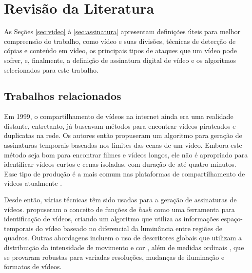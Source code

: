 

\chapter{Revisão da Literatura}
\label{chap:revisao}

As Seções \ref{sec:video} à \ref{sec:assinatura} apresentam definições úteis para melhor compreensão do trabalho, como vídeo e suas divisões, técnicas de detecção de cópias e conteúdo em vídeo, os principais tipos de ataques que um vídeo pode sofrer, e, finalmente, a definição de assinatura digital de vídeo e os algoritmos selecionados para este trabalho.

\section{Trabalhos relacionados}
\label{chap:relacionados}



Em 1999, o compartilhamento de vídeos na internet ainda era uma realidade distante, entretanto,  já buscavam métodos para encontrar vídeos pirateados e duplicatas na rede. Os autores então propuseram um algoritmo para geração de assinaturas temporais baseadas nos limites das cenas de um vídeo. Embora este método seja bom para encontrar filmes e vídeos longos, ele não é apropriado para identificar vídeos curtos e cenas isoladas, com duração de até quatro minutos. Esse tipo de produção é a mais comum nas plataformas de compartilhamento de vídeos atualmente \cite{comscoreinc} .

Desde então, várias técnicas têm sido usadas para a geração de assinaturas de vídeos.  propuseram o conceito de funções de \textit{hash} como uma ferramenta para identificação de vídeos, criando um algoritmo que utiliza as informações espaço-temporais do vídeo baseado no diferencial da luminância entre regiões de quadros. Outras abordagens incluem o uso de descritores globais que utilizam a distribuição da intensidade de movimento e cor \cite{hampapur2001comparison}, além de medidas ordinais \cite{hua2004robust}, que se provaram robustas para variadas resoluções, mudanças de iluminação e formatos de vídeos.	   	

